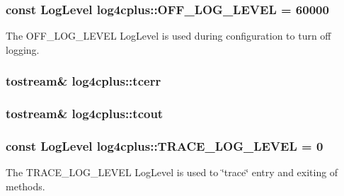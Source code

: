 \hypertarget{namespacelog4cplus_aaa2b4ed77016eca6e26cac1f148d20c6}{
\subsubsection[{O\-F\-F\-\_\-\-L\-O\-G\-\_\-\-L\-E\-V\-E\-L}]{\setlength{\rightskip}{0pt plus 5cm}const {\bf Log\-Level} log4cplus\-::\-O\-F\-F\-\_\-\-L\-O\-G\-\_\-\-L\-E\-V\-E\-L = 60000}}\label{namespacelog4cplus_aaa2b4ed77016eca6e26cac1f148d20c6}
The {\ttfamily O\-F\-F\-\_\-\-L\-O\-G\-\_\-\-L\-E\-V\-E\-L} Log\-Level is used during configuration to turn off logging. \hypertarget{namespacelog4cplus_a2ea95cedc8798f6db66c7c0c0a05fb5b}{
\subsubsection[{tcerr}]{ {\bf tostream}\& log4cplus\-::tcerr}}\label{namespacelog4cplus_a2ea95cedc8798f6db66c7c0c0a05fb5b}
\hypertarget{namespacelog4cplus_a8705d2fccaec75d0902c2cf0eb710ae8}{
\subsubsection[{tcout}]{ {\bf tostream}\& log4cplus\-::tcout}}\label{namespacelog4cplus_a8705d2fccaec75d0902c2cf0eb710ae8}
\hypertarget{namespacelog4cplus_a4ee6ad08f0e8c93a9ac1ad4678115ca6}{
\subsubsection[{T\-R\-A\-C\-E\-\_\-\-L\-O\-G\-\_\-\-L\-E\-V\-E\-L}]{\setlength{\rightskip}{0pt plus 5cm}const {\bf Log\-Level} log4cplus\-::\-T\-R\-A\-C\-E\-\_\-\-L\-O\-G\-\_\-\-L\-E\-V\-E\-L = 0}}\label{namespacelog4cplus_a4ee6ad08f0e8c93a9ac1ad4678115ca6}
The {\ttfamily T\-R\-A\-C\-E\-\_\-\-L\-O\-G\-\_\-\-L\-E\-V\-E\-L} Log\-Level is used to \char`\"{}trace\char`\"{} entry and exiting of methods. 

